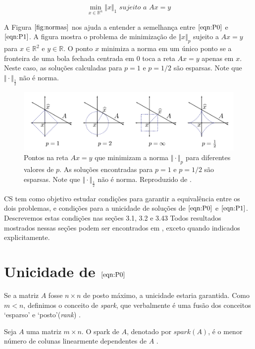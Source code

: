 \begin{equation}
\tag{$P_1$}
\min_{x \in \mathbb{R}^n} \Vert x \Vert_{1} \textit{ sujeito a } Ax = y
\label{eqn:P1}
\end{equation}

A Figura $\ref{fig:normas}$ nos ajuda a entender a semelhança entre $\eqref{eqn:P0}$ e $\eqref{eqn:P1}$. A figura mostra o problema de minimização de $\Vert x \Vert_p$ sujeito a $Ax = y$ para $x \in \mathbb{R}^2$ e $y \in \mathbb{R}$. O ponto $x$ minimiza a norma em um único ponto se a fronteira de uma bola fechada centrada em $0$ toca a reta $Ax = y$ apenas em $x$. Neste caso, as soluções calculadas para $p = 1$ e $p = 1/2$ são esparsas. Note que $\Vert \cdot \Vert_{\frac{1}{2}}$ não é norma.

\begin{figure}
\centering
\includegraphics[scale=.6]{imagens/normas.png}
\caption{Pontos na reta $Ax = y$ que minimizam a norma $\Vert \cdot \Vert_p$ para diferentes valores de $p$. As soluções encontradas para $p = 1$ e $p = 1/2$ são esparsas. Note que $\Vert \cdot \Vert_{\frac{1}{2}}$ não é norma. Reproduzido de \cite{ddek}.}
\label{fig:normas}
\end{figure}

CS tem como objetivo estudar condições para garantir a equivalência entre os dois problemas, e condições para a unicidade de soluções de $\eqref{eqn:P0}$ e $\eqref{eqn:P1}$. Descrevemos estas condições nas seções 3.1, 3.2 e 3.43 Todos resultados mostrados nessas seções podem ser encontrados em \cite{ddek}, exceto quando indicados explicitamente.

\section{Unicidade de $\eqref{eqn:P0}$}
Se a matriz $A$ fosse $n \times n$ de posto máximo, a unicidade estaria garantida. Como $m < n$, definimos o conceito de \textit{spark}, que verbalmente é uma fusão dos conceitos `esparso' e `posto'(\textit{rank}) \cite{kutyniok}.

\begin{definicao}
Seja $A$ uma matriz $m \times n$. O spark de $A$, denotado por $\textit{spark}(A)$, é o menor número de colunas linearmente dependentes de $A$ .
\end{definicao}

